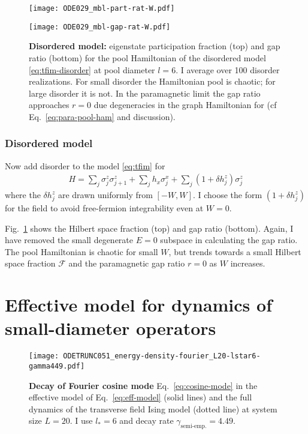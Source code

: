 \documentclass[aps,prb,nofootinbib,twocolumn,balancelastpage,amsmath,amssymb,floatfix,superscriptaddress,]{revtex4-1}
\newcommand{\semiemp}{\text{semi-emp.}}
\begin{document}
{  \begin{figure}
    \begin{minipage}{0.45\textwidth}
      \texttt{[image: ODE029\_mbl-part-rat-W.pdf]}
    \end{minipage}
    \begin{minipage}{0.45\textwidth}
      \texttt{[image: ODE029\_mbl-gap-rat-W.pdf]}
    \end{minipage}
    \caption{
      \textbf{Disordered model:} eigenstate participation fraction (top) and gap ratio (bottom) for the pool Hamiltonian of the disordered model \eqref{eq:tfim-disorder} at pool diameter $l = 6$. I average over 100 disorder realizations. For small disorder the Hamiltonian pool is chaotic; for large disorder it is not.
      In the paramagnetic limit the gap ratio approaches $r = 0$ due degeneracies in the graph Hamiltonian for (cf Eq.~\eqref{eq:para-pool-ham} and discussion).
    }
    \label{fig:chaos-disordered}
  \end{figure}
  

  \subsubsection{Disordered model}

  Now add disorder to the model \eqref{eq:tfim} for
  \begin{align}
    \label{eq:tfim-disorder}
    H = \sum_j \sigma^z_j \sigma^z_{j+1} + \sum_j h_x \sigma^x_j + \sum_j (1 + \delta h^z_j) \sigma^z_j
  \end{align}
  where the $\delta h^z_j$ are drawn uniformly from $[-W,W]$.
  I choose the form $(1+ \delta h^z_j)$ for the field to avoid free-fermion integrability even at $W = 0$.

  Fig.~\ref{fig:chaos-disordered} shows the Hilbert space fraction (top) and gap ratio (bottom).
  Again, I have removed the small degenerate $E = 0$ subspace in calculating the gap ratio.
  The pool Hamiltonian is chaotic for small $W$, but trends towards a small Hilbert space fraction $\mathcal F$ and the paramagnetic gap ratio $r = 0$ as $W$ increases.
  
\section{Effective model for dynamics of small-diameter operators}\label{s:eff-model}
\begin{figure}
  \texttt{[image: ODETRUNC051\_energy-density-fourier\_L20-lstar6-gamma449.pdf]}
  \caption{\textbf{Decay of Fourier cosine mode} Eq.~\eqref{eq:cosine-mode} in the effective model of Eq.~\eqref{eq:eff-model} (solid lines) and the full dynamics of the transverse field Ising model (dotted line) at system size $L = 20$. I use $l_* = 6$ and decay rate $\gamma_\semiemp = 4.49$.
    }
  \label{fig:fourier-decay}
\end{figure}

}
\end{document}
